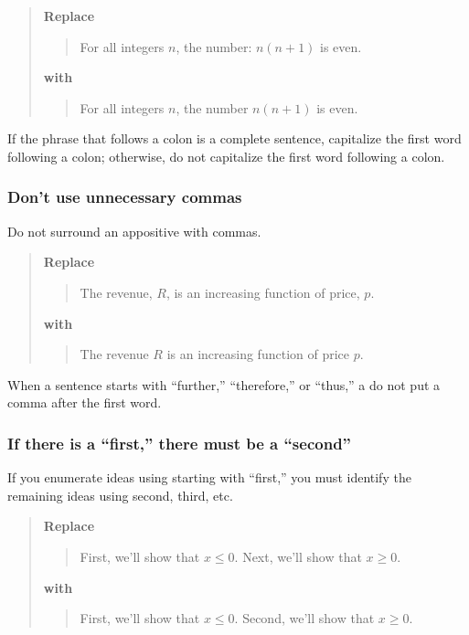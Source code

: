 \documentclass[12pt,fleqn]{article}
\newcounter{ex}\setcounter{ex}{0}
\newcounter{id}\setcounter{id}{0}
\newcounter{se}\setcounter{se}{0}
\begin{document}
\begin{quote}
\textbf{\textbf{Replace}}
\begin{quote}
  For all integers \(n\), the number: \(n (n + 1) \) is even.
\end{quote}
\textbf{with}
\begin{quote}
   For all integers \(n\), the number \(n (n + 1) \) is even.
\end{quote}
\end{quote}
If the phrase that follows a colon is a complete sentence, 
capitalize the first word following a colon; otherwise, do
not capitalize the first word following a colon.
 
 \subsubsection{ Don't use unnecessary commas}

Do not surround an appositive with commas.

\begin{quote}
\textbf{\textbf{Replace}}
\begin{quote}
  The revenue, \(R\), is an increasing function of price, \(p\).
\end{quote}
\textbf{with}
\begin{quote}
  The revenue \(R\) is an increasing function of price \(p\).
\end{quote}
\end{quote}
When a sentence starts with ``further,'' ``therefore,'' or ``thus,''
a do not put a comma after the first word.


 \subsubsection{ If there is a ``first,'' there must be a ``second''}

If you enumerate ideas using starting with ``first,'' you must identify
the remaining ideas using second, third, etc.

\begin{quote}
\textbf{\textbf{Replace}}
\begin{quote}
First, we'll show that \(x \leq 0\). Next, we'll show that
\(x \geq 0\).
\end{quote}
\textbf{with}
\begin{quote}
First, we'll show that \(x \leq 0\).  Second, we'll show that
\mbox{\(x \geq 0\)}.
\end{quote}
\end{quote}
\end{document}
